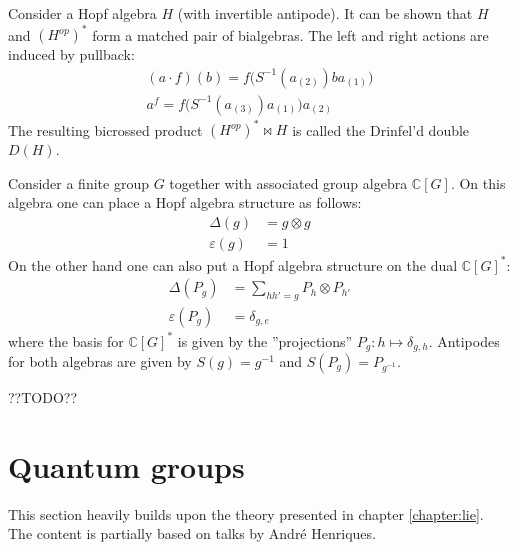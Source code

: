 	\begin{construct}
		Consider a Hopf algebra $H$ (with invertible antipode). It can be shown that $H$ and $(H^{op})^*$ form a matched pair of bialgebras. The left and right actions are induced by pullback:
		\begin{gather}
			(a\cdot f)(b) = f\big(S^{-1}(a_{(2)})ba_{(1)}\big)\\
			a^f = f\big(S^{-1}(a_{(3)})a_{(1)}\big)a_{(2)}
		\end{gather}
		The resulting bicrossed product $(H^{op})^*\bowtie H$ is called the Drinfel'd double $D(H)$.
	\end{construct}
	\begin{example}
		Consider a finite group $G$ together with associated group algebra $\mathbb{C}[G]$. On this algebra one can place a Hopf algebra structure as follows:
		\begin{align}
			\Delta(g) &= g\otimes g\\
			\varepsilon(g) &= 1
		\end{align}
		On the other hand one can also put a Hopf algebra structure on the dual $\mathbb{C}[G]^*$:
		\begin{align}
			\Delta(P_g) &= \sum_{hh'=g}P_h\otimes P_{h'}\\
			\varepsilon(P_g) &= \delta_{g, e}
		\end{align}
		where the basis for $\mathbb{C}[G]^*$ is given by the ''projections'' $P_g:h\mapsto\delta_{g,h}$. Antipodes for both algebras are given by $S(g)=g^{-1}$ and $S(P_g) = P_{g^{-1}}$.
		
		??TODO??
	\end{example}

\section{Quantum groups}

	This section heavily builds upon the theory presented in chapter \ref{chapter:lie}. The content is partially based on talks by Andr\'e Henriques.

